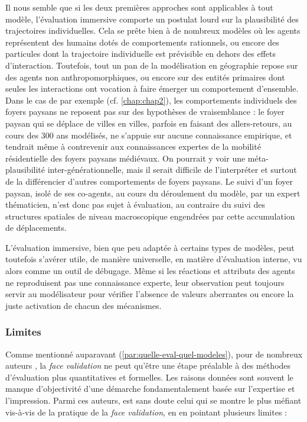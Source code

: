 Il nous semble que si les deux premières approches sont applicables à tout modèle, l'évaluation immersive comporte un postulat lourd sur la plausibilité des trajectoires individuelles.
Cela se prête bien à de nombreux modèles où les agents représentent des humains dotés de comportements rationnels, ou encore des particules dont la trajectoire individuelle est prévisible en dehors des effets d'interaction.
Toutefois, tout un pan de la modélisation en géographie repose sur des agents non anthropomorphiques, ou encore sur des entités primaires dont seules les interactions ont vocation à faire émerger un comportement d'ensemble.
Dans le cas de \simfeodal{} par exemple (cf. \cref{chap:chap2}), les comportements individuels des foyers paysans ne reposent pas sur des hypothèses de vraisemblance :
	le foyer paysan qui se déplace de villes en villes, parfois en faisant des allers-retours, au cours des 300 ans modélisés, ne s'appuie sur aucune connaissance empirique, et tendrait même à contrevenir aux connaissances expertes de la mobilité résidentielle des foyers paysans médiévaux.
On pourrait y voir une \og méta-plausibilité\fg{} inter-générationnelle, mais il serait difficile de l'interpréter et surtout de la différencier d'autres comportements de foyers paysans.
Le suivi d'un foyer paysan, isolé de ses co-agents, au cours du déroulement du modèle, par un expert thématicien, n'est donc pas sujet à évaluation, au contraire du suivi des structures spatiales de niveau macroscopique engendrées par cette accumulation de déplacements.

L'évaluation immersive, bien que peu adaptée à certains types de modèles, peut toutefois s'avérer utile, de manière universelle, en matière d'évaluation interne, vu alors comme un outil de \og débugage\fg{}.
Même si les réactions et attributs des agents ne reproduisent pas une connaissance experte, leur observation peut toujours servir au modélisateur pour vérifier l'absence de valeurs aberrantes ou encore la juste activation de chacun des mécanismes.



\subsubsection{Limites \label{subsubsec:limites-face-validation}}

Comme mentionné auparavant (\ref{par:quelle-eval-quel-modeles}), pour de nombreux auteurs \autocite{hermann_validation_1967, balci_validation_1994, kennedy_verification_2006}, la \textit{face validation} ne peut qu'être une étape préalable à des méthodes d'évaluation plus quantitatives et formelles.
Les raisons données sont souvent le manque d'objectivité d'une démarche fondamentalement basée sur l'expertise et l'impression.
Parmi ces auteurs, \citeauthor{hermann_validation_1967} est sans doute celui qui se montre le plus méfiant vis-à-vis de la pratique de la \textit{face validation}, en en pointant plusieurs limites :

